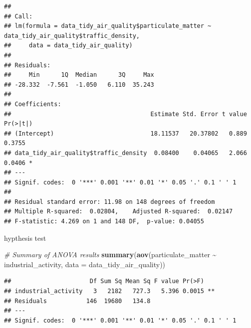 \documentclass[
]{article}
\newenvironment{Shaded}{\begin{snugshade}}{\end{snugshade}}
\newcommand{\AttributeTok}[1]{\textcolor[rgb]{0.13,0.29,0.53}{#1}}
\newcommand{\CommentTok}[1]{\textcolor[rgb]{0.56,0.35,0.01}{\textit{#1}}}
\newcommand{\FunctionTok}[1]{\textcolor[rgb]{0.13,0.29,0.53}{\textbf{#1}}}
\newcommand{\NormalTok}[1]{#1}
\newcommand{\SpecialCharTok}[1]{\textcolor[rgb]{0.81,0.36,0.00}{\textbf{#1}}}
\begin{document}
\begin{verbatim}
## 
## Call:
## lm(formula = data_tidy_air_quality$particulate_matter ~ data_tidy_air_quality$traffic_density, 
##     data = data_tidy_air_quality)
## 
## Residuals:
##     Min      1Q  Median      3Q     Max 
## -28.332  -7.561  -1.050   6.110  35.243 
## 
## Coefficients:
##                                       Estimate Std. Error t value Pr(>|t|)  
## (Intercept)                           18.11537   20.37802   0.889   0.3755  
## data_tidy_air_quality$traffic_density  0.08400    0.04065   2.066   0.0406 *
## ---
## Signif. codes:  0 '***' 0.001 '**' 0.01 '*' 0.05 '.' 0.1 ' ' 1
## 
## Residual standard error: 11.98 on 148 degrees of freedom
## Multiple R-squared:  0.02804,    Adjusted R-squared:  0.02147 
## F-statistic: 4.269 on 1 and 148 DF,  p-value: 0.04055
\end{verbatim}

hypthesis test

\begin{Shaded}
\begin{Highlighting}[]
\CommentTok{\# Summary of ANOVA results}
\FunctionTok{summary}\NormalTok{(}\FunctionTok{aov}\NormalTok{(particulate\_matter }\SpecialCharTok{\textasciitilde{}}\NormalTok{ industrial\_activity, }\AttributeTok{data =}\NormalTok{ data\_tidy\_air\_quality))}
\end{Highlighting}
\end{Shaded}

\begin{verbatim}
##                      Df Sum Sq Mean Sq F value Pr(>F)   
## industrial_activity   3   2182   727.3   5.396 0.0015 **
## Residuals           146  19680   134.8                  
## ---
## Signif. codes:  0 '***' 0.001 '**' 0.01 '*' 0.05 '.' 0.1 ' ' 1
\end{verbatim}
\end{document}
